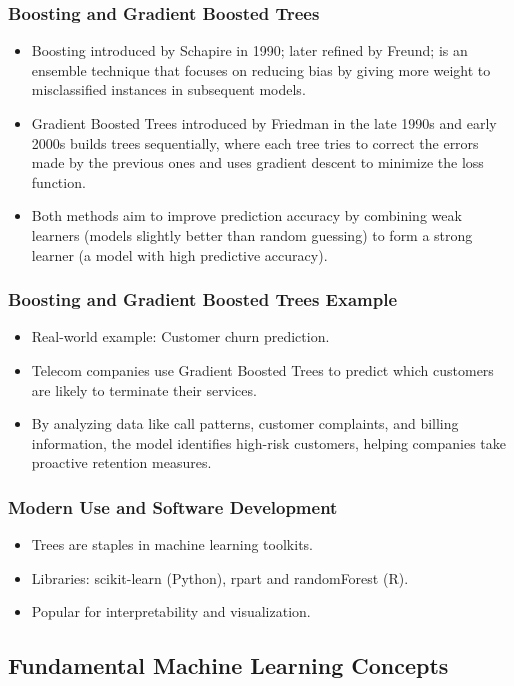 \documentclass{beamer}
\begin{document}
\begin{frame}
\frametitle{Boosting and Gradient Boosted Trees}
\begin{itemize}
    \item Boosting introduced by Schapire in 1990; later refined by Freund; is an ensemble technique that focuses on reducing bias by giving more weight to misclassified instances in subsequent models.
    \item Gradient Boosted Trees introduced by Friedman in the late 1990s and early 2000s builds trees sequentially, where each tree tries to correct the errors made by the previous ones and uses gradient descent to minimize the loss function.
    \item Both methods aim to improve prediction accuracy by combining weak learners (models slightly better than random guessing) to form a strong learner (a model with high predictive accuracy).
\end{itemize}
\end{frame}

\begin{frame}
\frametitle{Boosting and Gradient Boosted Trees Example}
\begin{itemize}
    \item Real-world example: Customer churn prediction. 
    \item Telecom companies use Gradient Boosted Trees to predict which customers are likely to terminate their services.
    \item By analyzing data like call patterns, customer complaints, and billing information, the model identifies high-risk customers, helping companies take proactive retention measures.
\end{itemize}
\end{frame}


\begin{frame}
\frametitle{Modern Use and Software Development}
\begin{itemize}
    \item Trees are staples in machine learning toolkits.
    \item Libraries: scikit-learn (Python), rpart and randomForest (R).
    \item Popular for interpretability and visualization.
\end{itemize}
\end{frame}





\subsection{Fundamental Machine Learning Concepts}
\end{document}
